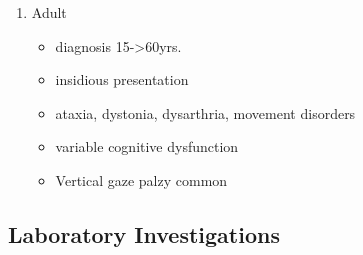 \documentclass{scrartcl}
\begin{document}
\begin{enumerate}
\begin{enumerate}
\item Adult
\label{sec:org5729565}
\begin{itemize}
\item diagnosis 15->60yrs.
\item insidious presentation
\item ataxia, dystonia, dysarthria, movement disorders
\item variable cognitive dysfunction
\item Vertical gaze palzy common
\end{itemize}
\end{enumerate}
\end{enumerate}

\subsection{Laboratory Investigations}
\label{sec:org79d6d87}
\end{document}

